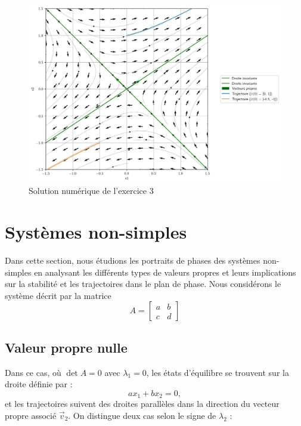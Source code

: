             \begin{figure}[ht!]
                \centering
                \includegraphics[width=\textwidth]{images/pdp_exercice_3.jpg}
                \caption{Solution numérique de l'exercice 3}
                \label{fig:pdp_exercice_3}
            \end{figure}
   \section{Systèmes non-simples}
        Dans cette section, nous étudions les portraits de phases des systèmes non-simples en analysant les différents types de valeurs propres et leurs implications sur la stabilité et les trajectoires dans le plan de phase. Nous considérons le système décrit par la matrice
        \begin{equation}
            A = \begin{bmatrix}
                a & b\\
                c & d
            \end{bmatrix}
        \end{equation}

        \subsection{Valeur propre nulle}
            Dans ce cas, où $\det A = 0$ avec $\lambda_1 = 0$, les états d'équilibre se trouvent sur la droite définie par :
            \begin{equation}
            ax_1 + bx_2 = 0,
            \end{equation}
            et les trajectoires suivent des droites parallèles dans la direction du vecteur propre associé $\overrightarrow  v_2$. On distingue deux cas selon le signe de $\lambda_2$ :
            

